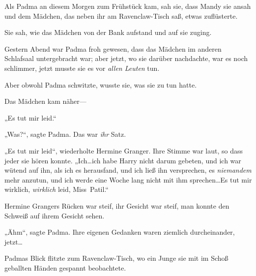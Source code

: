 \later

Als Padma an diesem Morgen zum Frühstück kam, sah sie, dass Mandy sie ansah und dem Mädchen, das neben ihr am Ravenclaw-Tisch saß, etwas zuflüsterte.

Sie sah, wie das Mädchen von der Bank aufstand und auf sie zuging.

Gestern Abend war Padma froh gewesen, dass das Mädchen im anderen Schlafsaal untergebracht war; aber jetzt, wo sie darüber nachdachte, war es noch schlimmer, jetzt musste sie es vor \emph{allen Leuten} tun.

Aber obwohl Padma schwitzte, wusste sie, was sie zu tun hatte.

Das Mädchen kam näher—

„Es tut mir leid.“

„Was?“, sagte Padma. Das war \emph{ihr} Satz.

„Es tut mir leid“, wiederholte Hermine Granger. Ihre Stimme war laut, so dass jeder sie hören konnte. „Ich…ich habe Harry nicht darum gebeten, und ich war wütend auf ihn, als ich es herausfand, und ich ließ ihn versprechen, es \emph{niemandem} mehr anzutun, und ich werde eine Woche lang nicht mit ihm sprechen…Es tut mir wirklich, \emph{wirklich} leid, Miss~Patil.“

Hermine Grangers Rücken war steif, ihr Gesicht war steif, man konnte den Schweiß auf ihrem Gesicht sehen.

„Ähm“, sagte Padma. Ihre eigenen Gedanken waren ziemlich durcheinander, jetzt…

Padmas Blick flitzte zum Ravenclaw-Tisch, wo ein Junge sie mit im Schoß geballten Händen gespannt beobachtete.

